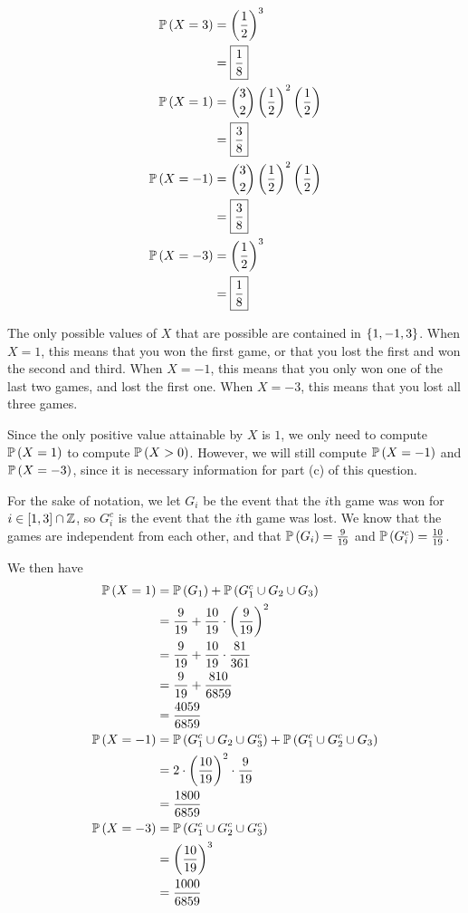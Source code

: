 \documentclass{article}
\begin{document}
\begin{align*}
  \mathbb{P} \left ( X = 3 \right) &= \left (\frac{1}{2} \right)^3 \\
             &= \boxed{\frac{1}{8}} \\
  \mathbb{P} \left ( X = 1 \right) &= \binom{3}{2} \left (\frac{1}{2} \right)^2 \left (\frac{1}{2} \right) \\
             &= \boxed{\frac{3}{8}} \\
  \mathbb{P} \left ( X = -1 \right) &= \binom{3}{2} \left (\frac{1}{2} \right)^2 \left (\frac{1}{2} \right) \\
             &= \boxed{\frac{3}{8}} \\
   \mathbb{P} \left ( X = -3 \right) &= \left (\frac{1}{2} \right)^3 \\
             &= \boxed{\frac{1}{8}} \\
\end{align*}


\setcounter{problem}{20}
\problem{}
\subproblema{}

The only possible values of $X$ that are possible are contained in $\left \{ 1, -1, 3 \right \}$.
When $X = 1$,
this means that you won the first game,
or that you lost the first and won the second and third.
When $X = -1$,
this means that you only won one of the last two games,
and lost the first one.
When $X = -3$,
this means that you lost all three games.

Since the only positive value attainable by $X$ is $1$,
we only need to compute $\mathbb{P} \left ( X = 1 \right)$ to compute $\mathbb{P} \left ( X > 0 \right)$.
However,
we will still compute $\mathbb{P} \left ( X = -1 \right)$ and $\mathbb{P} \left ( X = -3 \right)$,
since it is necessary information for part (c) of this question.

For the sake of notation,
we let $G_i$ be the event that the $i$th game was won for $i \in \left [ 1, 3 \right] \cap \mathbb Z$,
so $G_i^c$ is the event that the $i$th game was lost.
We know that the games are independent from each other,
and that $\mathbb{P} \left ( G_i \right) = \frac{9}{19}$ and $\mathbb{P} \left ( G_i^c \right) = \frac{10}{19}$.

We then have
\begin{align*}
  \mathbb{P} \left ( X = 1 \right) &= \mathbb{P} \left ( G_1 \right) + \mathbb{P} \left ( G_1^c \cup G_2 \cup G_3 \right) \\
             &= \frac{9}{19} + \frac{10}{19} \cdot \left (\frac{9}{19} \right)^2 \\
             &= \frac{9}{19} + \frac{10}{19} \cdot \frac{81}{361} \\
             &= \frac{9}{19} + \frac{810}{6859} \\
             &= \frac{4059}{6859} \\
  \mathbb{P} \left ( X = -1 \right) &= \mathbb{P} \left ( G_1^c \cup G_2 \cup G_3^c \right) + \mathbb{P} \left ( G_1^c \cup G_2^c \cup G_3 \right) \\
             &= 2 \cdot \left (\frac{10}{19} \right)^2 \cdot \frac{9}{19} \\
             &= \frac{1800}{6859} \\
  \mathbb{P} \left ( X = -3 \right) &= \mathbb{P} \left ( G_1^c \cup G_2^c \cup G_3^c \right) \\
             &= \left (\frac{10}{19} \right)^3 \\
             &= \frac{1000}{6859} \\
\end{align*}
\end{document}
